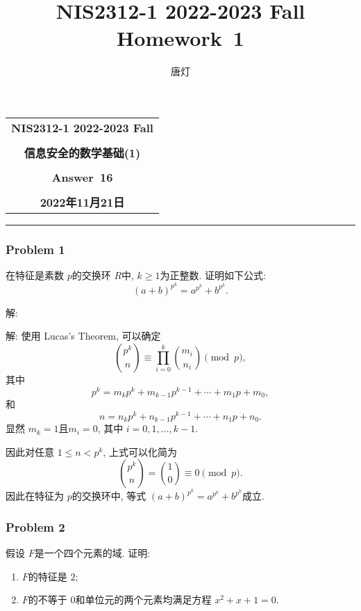 \documentclass[a4paper,12pt]{ctexart}
\title{NIS2312-1 2022-2023 Fall Homework~1}
\author{唐灯}
\begin{document}
  \begin{center}

  \vspace{-0.3in}
  \begin{tabular}{c}
    \textbf{\Large NIS2312-1 2022-2023 Fall} \\
    \textbf{\Large  } \\
    \textbf{\Large  信息安全的数学基础(1)} \\
    \textbf{\Large  } \\
    \textbf{\Large  Answer~16} \\
    \textbf{\Large  } \\
    \textbf{\Large 2022年11月21日} \\
  \end{tabular}
  \end{center}
  \noindent
  \rule{\linewidth}{0.4pt}
  

\subsubsection*{Problem 1}
    在特征是素数 $ p $的交换环 $ R $中, $ k\ge 1 $为正整数. 证明如下公式:
    \[\left( a+b \right)^{p^k}=a^{p^k}+b^{p^k}.\]

    解: 

    解: 使用 Lucas's Theorem, 可以确定 
    \[ \binom{p^k}{n}\equiv\prod_{i=0}^k\binom{m_i}{n_i}\pmod{p}, \]
    其中 
    \[p^k=m_kp^k+m_{k-1}p^{k-1}+\cdots+m_1p+m_0,\]
    和 
    \[n=n_kp^k+n_{k-1}p^{k-1}+\cdots+n_1p+n_0.\]
    显然 $ m_k=1$且$ m_i=0 $, 其中 $ i=0,1,...,k-1 $. 
    
    因此对任意 $ 1\le n<p^k $, 上式可以化简为  
    \[ \binom{p^k}{n}=\binom{1}{0}\equiv 0\pmod{p}.  \]
    因此在特征为 $ p $的交换环中, 等式 $ \left( a+b \right)^{p^k}=a^{p^k}+b^{p^k} $成立.


\subsubsection*{Problem 2} 
    假设 $ F $是一个四个元素的域. 证明:
    \begin{enumerate}[label=(\arabic{*})]
      \item $ F $的特征是 $ 2 $;
      \item $ F $的不等于 $ 0 $和单位元的两个元素均满足方程 $ x^2+x+1=0 $.
    \end{enumerate}  
\end{document}
